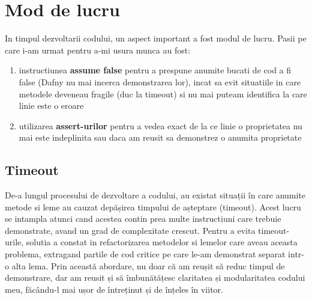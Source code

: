\section{Mod de lucru}
In timpul dezvoltarii codului, un aspect important a fost modul de lucru. Pasii pe care i-am urmat pentru a-mi usura munca au fost:
\begin{enumerate}
    \item instructiunea \textbf{assume false} pentru a prespune anumite bucati de cod a fi false (Dafny nu mai incerca demonstrarea lor), incat sa evit situatiile in care metodele deveneau fragile (duc la timeout) si nu mai puteam identifica la care linie este o eroare
    \item utilizarea \textbf{assert-urilor} pentru a vedea exact de la ce linie o proprietatea nu mai este indeplinita sau daca am reusit sa demonstrez o anumita proprietate
\end{enumerate}
\subsection{Timeout}
De-a lungul procesului de dezvoltare a codului, au existat situații în care anumite metode si leme au cauzat depășirea timpului de așteptare (timeout). Acest lucru se intampla atunci cand acestea contin prea multe instructiuni care trebuie demonstrate, avand un grad de complexitate crescut.
Pentru a evita timeout-urile, solutia a constat in refactorizarea metodelor si lemelor care aveau aceasta problema, extragand partile de cod critice pe care le-am demonstrat separat intr-o alta lema. Prin această abordare, nu doar că am reușit să reduc timpul de demonstrare, dar am reusit și să îmbunătățesc claritatea și modularitatea codului meu, făcându-l mai ușor de întreținut și de înțeles în viitor.

















